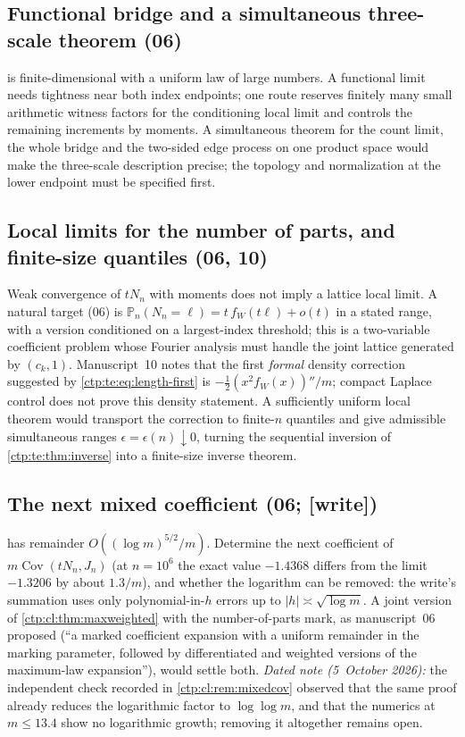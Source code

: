 \documentclass[11pt,a4paper]{article}
\numberwithin{equation}{section}
\theoremstyle{definition}
\theoremstyle{remark}
\newcommand{\PP}{\mathbb P}
\DeclareMathOperator{\Cov}{Cov}
\begin{document}
\subsection{Functional bridge and a simultaneous three-scale theorem (06)}
 is finite-dimensional with a uniform law of large
numbers. A functional limit needs tightness near both index endpoints; one
route reserves finitely many small arithmetic witness factors for the
conditioning local limit and controls the remaining increments by moments.
A simultaneous theorem for the count limit, the whole bridge and the
two-sided edge process on one product space would make the three-scale
description precise; the topology and normalization at the lower endpoint
must be specified first.

\subsection{Local limits for the number of parts, and finite-size quantiles (06, 10)}
Weak convergence of $tN_n$ with moments does not imply a lattice local
limit. A natural target (06) is $\PP_n(N_n=\ell)=t\,f_W(t\ell)+o(t)$ in a
stated range, with a version conditioned on a largest-index threshold; this
is a two-variable coefficient problem whose Fourier analysis must handle the
joint lattice generated by $(c_k,1)$. Manuscript~10 notes that the first
\emph{formal} density correction suggested by \eqref{ctp:te:eq:length-first}
is $-\tfrac12(x^2f_W(x))''/m$; compact Laplace control does not prove this
density statement. A sufficiently uniform local theorem would transport the
correction to finite-$n$ quantiles and give admissible simultaneous ranges
$\epsilon=\epsilon(n)\downarrow0$, turning the sequential inversion of
\cref{ctp:te:thm:inverse} into a finite-size inverse theorem.

\subsection{The next mixed coefficient (06; [write])}
 has remainder $O((\log m)^{5/2}/m)$. Determine the
next coefficient of $m\Cov(tN_n,J_n)$ (at $n=10^6$ the exact value $-1.4368$
differs from the limit $-1.3206$ by about $1.3/m$), and whether the logarithm
can be removed: the write's summation uses only polynomial-in-$h$ errors up
to $|h|\asymp\sqrt{\log m}$. A joint version of
\cref{ctp:cl:thm:maxweighted} with the number-of-parts mark, as manuscript~06
proposed (``a marked coefficient expansion with a uniform remainder in the
marking parameter, followed by differentiated and weighted versions of the
maximum-law expansion''), would settle both. \emph{Dated note
(5~October 2026):} the independent check recorded in
\cref{ctp:cl:rem:mixedcov} observed that the same proof already reduces
the logarithmic factor to $\log\log m$, and that the numerics at
$m\le13.4$ show no logarithmic growth; removing it altogether remains
open.
\end{document}
